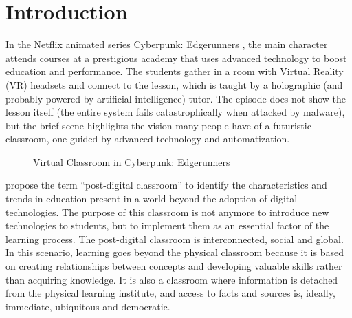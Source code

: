 
\chapter{Introduction}

In the Netflix animated series Cyberpunk: Edgerunners \parencite{cyberpunk_2022}, the main character attends courses at a prestigious academy that uses advanced technology to boost
education and performance. The students gather in a room with Virtual Reality (VR) headsets and connect to the lesson, which is taught by a holographic (and probably powered
by artificial intelligence) tutor. The episode does not show the lesson itself (the entire system fails catastrophically when attacked by malware), but the brief scene
highlights the vision many people have of a futuristic classroom, one guided by advanced technology and automatization.

\begin{figure}[t]
    \caption{Virtual Classroom in Cyberpunk: Edgerunners\label{fig:1-1}}
\end{figure}

\textcite{forsler_2024} propose the term “post-digital classroom” to identify the characteristics and trends in education
present in a world beyond the adoption of digital technologies. The purpose of this classroom is not anymore to
introduce new technologies to students, but to implement them as an essential factor of the learning process. The
post-digital classroom is interconnected, social and global. In this scenario, learning goes beyond the physical
classroom because it is based on creating relationships between concepts and developing valuable skills rather than
acquiring knowledge. It is also a classroom where information is detached from the physical learning institute, and
access to facts and sources is, ideally, immediate, ubiquitous and democratic.


